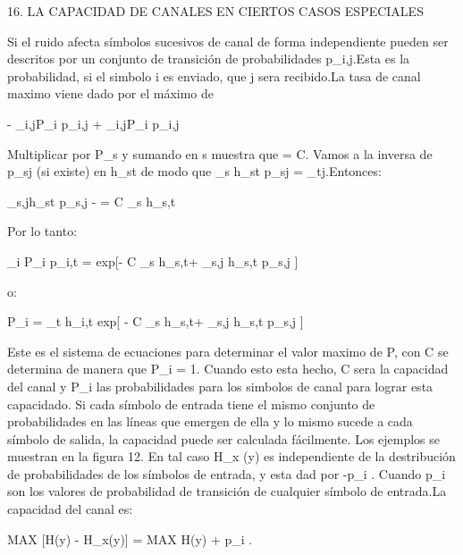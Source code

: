\begin{center}
16. LA CAPACIDAD DE CANALES EN CIERTOS CASOS ESPECIALES
\end{center}

Si el ruido afecta símbolos sucesivos de canal de forma independiente pueden ser descritos por un conjunto de transici\'on 
de probabilidades p_{i,j}.Esta es la probabilidad, si el simbolo i es enviado, que j sera recibido.La tasa de canal maximo 
viene dado por el m\'aximo de

\begin{center}
- \sum_{i,j}P_i p_{i,j}  + \sum_{i,j}P_i p_{i,j}
\end{center}
 
Multiplicar por P_s y sumando en s muestra que \mu = C. Vamos a la inversa de p_{sj} (si existe) en h_{st}  de modo que 
\sum_{s} h_{st} p_{sj} = \delta_{tj}.Entonces: 

\begin{center}
\sum_{s,j}h_{st} p_{s,j}  -  = C \sum_{s} h_{s,t}
\end{center}
Por lo tanto:

\begin{center}
\sum_{i} P_i p_{i,t} = exp[- C \sum_{s} h_{s,t}+ \sum_{s,j} h_{s,t} p_{s,j} ]
\end{center}

o:  
\begin{center}
P_i = \sum_{t} h_{i,t} exp[ - C \sum_{s} h_{s,t}+ \sum_{s,j} h_{s,t} p_{s,j}  ]
\end{center}


Este es el sistema de ecuaciones para determinar el valor maximo de P, con C se determina 
de manera que \sum P_i = 1. Cuando esto esta hecho, C sera la capacidad del canal y P_i las probabilidades 
para los simbolos de canal para lograr esta capacidado.
Si cada s\'imbolo de entrada tiene el mismo conjunto de probabilidades en las l\'ineas que emergen de ella 
y lo mismo sucede a cada s\'imbolo de salida, la capacidad puede ser calculada f\'acilmente. Los ejemplos se muestran en la figura 12. 
En tal caso H_x (y) es independiente de la destribuci\'on de probabilidades de los s\'imbolos de entrada, y esta dad por -\sum p_i . 
Cuando p_i son los valores de probabilidad de transici\'on de cualquier s\'imbolo de entrada.La capacidad del canal es:

\begin{center}
MAX [H(y) - H_x(y)] = MAX H(y) + \sum p_i .
\end{center}
  
